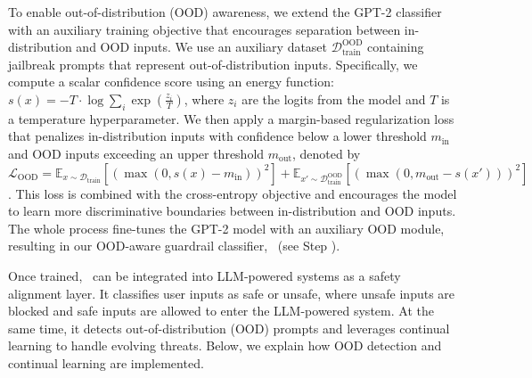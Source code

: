 To enable out-of-distribution (OOD) awareness, we extend the GPT-2 classifier with an auxiliary training objective that encourages separation between in-distribution and OOD inputs.
We use an auxiliary dataset $\mathcal{D}_{\text{train}}^{\text{OOD}}$ containing jailbreak prompts that represent out-of-distribution inputs.
Specifically, we compute a scalar confidence score using an energy function:
$s(x) = -T \cdot \log \sum_{i} \exp\left(\frac{z_i}{T}\right)$,
where $z_i$ are the logits from the model and $T$ is a temperature hyperparameter. We then apply a margin-based regularization loss that penalizes in-distribution inputs with confidence below a lower threshold $m_{\text{in}}$ and OOD inputs exceeding an upper threshold $m_{\text{out}}$, denoted by $\mathcal{L}_{\text{OOD}} = \mathbb{E}_{x \sim \mathcal{D}_{\text{train}}} \left[\left(\max(0, s(x) - m_{\text{in}})\right)^2\right] + \mathbb{E}_{x' \sim \mathcal{D}_{\text{train}}^{\text{OOD}}} \left[\left(\max(0, m_{\text{out}} - s(x'))\right)^2\right]$.
This loss is combined with the cross-entropy objective and encourages the model to learn more discriminative boundaries between in-distribution and OOD inputs.
The whole process fine-tunes the GPT-2 model with an auxiliary OOD module, resulting in our OOD-aware guardrail classifier, \ourapp~(see Step ).

Once trained, \ourapp~can be integrated into LLM-powered systems as a safety alignment layer. It classifies user inputs as safe or unsafe, where unsafe inputs are blocked and safe inputs are allowed to enter the LLM-powered system.
At the same time, it detects out-of-distribution (OOD) prompts and leverages continual learning to handle evolving threats.
Below, we explain how OOD detection and continual learning are implemented.

